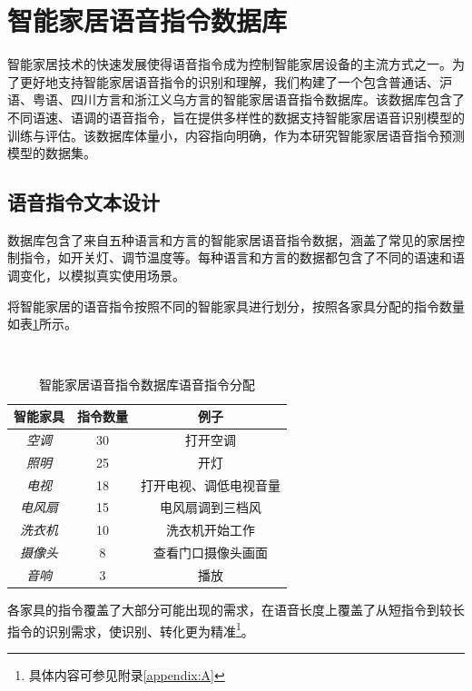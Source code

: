 \documentclass[lang=cn,cite=super]{elegantpaper}
\begin{document}
\section{智能家居语音指令数据库}
智能家居技术的快速发展使得语音指令成为控制智能家居设备的主流方式之一。为了更好地支持智能家居语音指令的识别和理解，我们构建了一个包含普通话、沪语、粤语、四川方言和浙江义乌方言的智能家居语音指令数据库。该数据库包含了不同语速、语调的语音指令，旨在提供多样性的数据支持智能家居语音识别模型的训练与评估。该数据库体量小，内容指向明确，作为本研究智能家居语音指令预测模型的数据集。

\subsection{语音指令文本设计}

数据库包含了来自五种语言和方言的智能家居语音指令数据，涵盖了常见的家居控制指令，如开关灯、调节温度等。每种语言和方言的数据都包含了不同的语速和语调变化，以模拟真实使用场景。

将智能家居的语音指令按照不同的智能家具进行划分，按照各家具分配的指令数量如表\ref{tab:1}所示。
\begin{table}
    \caption{\label{tab:1} 智能家居语音指令数据库语音指令分配}\
    \begin{center}
        \begin{tabular}{ccc}
            \hline
            \textbf{智能家具} & \textbf{指令数量} & \textbf{例子} \\
            \hline \hline
            \textit{空调} & 30 & 打开空调 \\
            \textit{照明} & 25 & 开灯 \\
            \textit{电视} & 18 & 打开电视、调低电视音量 \\
            \textit{电风扇} & 15 & 电风扇调到三档风 \\
            \textit{洗衣机} & 10 & 洗衣机开始工作 \\
            \textit{摄像头} & 8 & 查看门口摄像头画面 \\
            \textit{音响} & 3 & 播放\\
            \hline
        \end{tabular}
    \end{center}
\end{table}

各家具的指令覆盖了大部分可能出现的需求，在语音长度上覆盖了从短指令到较长指令的识别需求，使识别、转化更为精准\footnote{具体内容可参见附录\ref{appendix:A}}。
\end{document}
